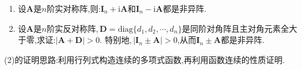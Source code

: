 \documentclass[../../main.tex]{subfiles}%
\begin{document}
\begin{proposition}\label{proposition:实对称与实反称矩阵性质}
\begin{enumerate}[(1)]
\item 设\(\boldsymbol{A}\)是\(n\)阶实对称阵,则:\(\boldsymbol{I}_n + \mathrm{i}\boldsymbol{A}\)和\(\boldsymbol{I}_n - \mathrm{i}\boldsymbol{A}\)都是非异阵.

\item 设\(\boldsymbol{A}\)是\(n\)阶实反对称阵,\(\,\boldsymbol{D}=\mathrm{diag}\{d_1,d_2,\cdots,d_n\}\)是同阶对角阵且主对角元素全大于零,求证:\(|\boldsymbol{A}+\boldsymbol{D}|>0\). 特别地,\(\,|\boldsymbol{I}_n\pm\boldsymbol{A}|>0\),从而\(\boldsymbol{I}_n\pm\boldsymbol{A}\)都是非异阵.
\end{enumerate}
\end{proposition}
\begin{note}
(2)的证明思路:利用行列式构造连续的多项式函数,再利用函数连续的性质证明.
\end{note}
\end{document}
